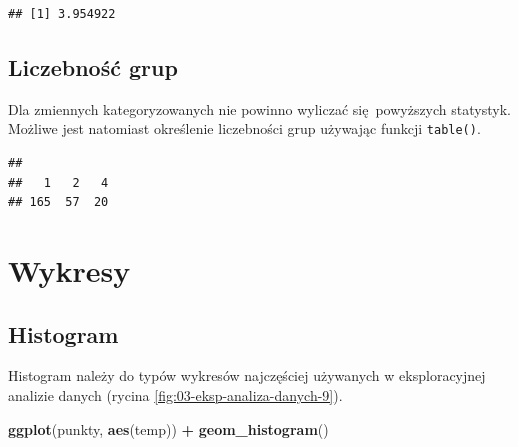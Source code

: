 \documentclass[
  paper=6in:9in,pagesize=pdftex,headinclude=on,footinclude=on,10pt]{scrbook}
\newenvironment{Shaded}{\begin{snugshade}}{\end{snugshade}}
\newcommand{\AttributeTok}[1]{\textcolor[rgb]{0.13,0.29,0.53}{#1}}
\newcommand{\ConstantTok}[1]{\textcolor[rgb]{0.56,0.35,0.01}{#1}}
\newcommand{\FunctionTok}[1]{\textcolor[rgb]{0.13,0.29,0.53}{\textbf{#1}}}
\newcommand{\NormalTok}[1]{#1}
\newcommand{\SpecialCharTok}[1]{\textcolor[rgb]{0.81,0.36,0.00}{\textbf{#1}}}
\begin{document}
\begin{Shaded}
\end{Shaded}

\begin{verbatim}
## [1] 3.954922
\end{verbatim}

\subsection{Liczebność grup}\label{liczebnoux15bux107-grup}

Dla zmiennych kategoryzowanych nie powinno wyliczać się~powyższych statystyk.
Możliwe jest natomiast określenie liczebności grup używając funkcji \texttt{table()}.

\begin{Shaded}
\end{Shaded}

\begin{verbatim}
## 
##   1   2   4 
## 165  57  20
\end{verbatim}

\section{Wykresy}\label{wykresy}

\subsection{Histogram}\label{histogram}

Histogram należy do typów wykresów najczęściej używanych w eksploracyjnej analizie danych (rycina \ref{fig:03-eksp-analiza-danych-9}).

\begin{Shaded}
\begin{Highlighting}[]
\FunctionTok{ggplot}\NormalTok{(punkty, }\FunctionTok{aes}\NormalTok{(temp)) }\SpecialCharTok{+} \FunctionTok{geom\_histogram}\NormalTok{()}
\end{Highlighting}
\end{Shaded}
\end{document}
